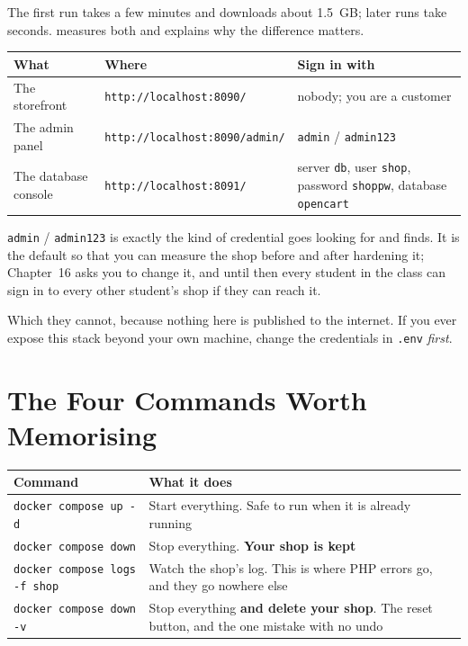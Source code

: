 The first run takes a few minutes and downloads about 1.5~GB; later runs take
seconds.  measures both and explains why the difference matters.

\begin{longtable}{@{}L{2.9cm}L{5.9cm}L{6.0cm}@{}}
\toprule
{}
\textbf{What} & \textbf{Where} & \textbf{Sign in with} \\
\midrule
\endhead
The storefront & \texttt{http://localhost:8090/} & nobody; you are a customer \\
The admin panel & \texttt{http://localhost:8090/admin/} & \texttt{admin} /
\texttt{admin123} \\
The database console & \texttt{http://localhost:8091/} & server \texttt{db},
user \texttt{shop}, password \texttt{shoppw}, database \texttt{opencart} \\
\bottomrule
\end{longtable}

\begin{alertbox}
\texttt{admin} / \texttt{admin123} is exactly the kind of credential
 goes looking for and finds. It is the default so that you can
measure the shop before and after hardening it; Chapter~16 asks you to change
it, and until then every student in the class can sign in to every other
student's shop if they can reach it.

\smallskip
Which they cannot, because nothing here is published to the internet. If you
ever expose this stack beyond your own machine, change the credentials in
\texttt{.env} \emph{first}.
\end{alertbox}

\section{The Four Commands Worth Memorising}

\begin{longtable}{@{}L{5.0cm}L{10.0cm}@{}}
\toprule
{}
\textbf{Command} & \textbf{What it does} \\
\midrule
\endhead
\texttt{docker compose up -d} & Start everything. Safe to run when it is
already running \\
\texttt{docker compose down} & Stop everything. \textbf{Your shop is kept} \\
\texttt{docker compose logs -f shop} & Watch the shop's log. This is where PHP
errors go, and they go nowhere else \\
\texttt{docker compose down -v} & Stop everything \textbf{and delete your
shop}. The reset button, and the one mistake with no undo \\
\bottomrule
\end{longtable}

